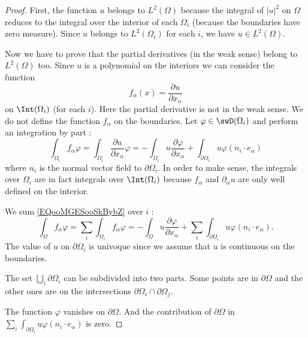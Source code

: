 \begin{proof}
    First, the function \( u\) belongs to \( L^2(\Omega)\) because the integral of \( | u |^2\) on \( \Omega\) reduces to the integral over the interior of each \( \Omega_i\) (because the boundaries have zero measure). Since \( u\) belongs to \( L^2(\Omega_i)\) for each \( i\), we have \( u\in L^2(\Omega)\).

    Now we have to prove that the partial derivatives (in the weak sense) belong to \( L^2(\Omega)\) too. Since \( u\) is a polynomial on the interiors we can consider the function
    \begin{equation}
        f_{\alpha}(x)=\frac{ \partial u }{ \partial x_{\alpha} }
    \end{equation}
    on \( \Int(\Omega_i)\) (for each \( i\)). Here the partial derivative is not in the weak sense. We do not define the function \( f_{\alpha}\) on the boundaries. Let \( \varphi\in \swD(\Omega_i)\) and perform an integration by part :
    \begin{equation}        \label{EQooMGESooSkBybZ}
        \int_{\Omega_i}f_{\alpha}\varphi=\int_{\Omega_i}\frac{ \partial u }{ \partial x_{\alpha} }\varphi=-\int_{\Omega_i}u\frac{ \partial \varphi }{ \partial x_{\alpha} }+\int_{\partial\Omega_i}u\varphi(n_i\cdot e_{\alpha})
    \end{equation}
    where \( n_i\) is the normal vector field to \( \partial\Omega_i\). In order to make sense, the integrals over \( \Omega_i\) are in fact integrals over \( \Int(\Omega_i)\) because \( f_{\alpha}\) and \( \partial_{\alpha}u\) are only well defined on the interior.

    We sum \eqref{EQooMGESooSkBybZ} over \( i\) :
    \begin{equation}        \label{EQooKACAooGlBMaQ}
        \int_{\Omega}f_{\alpha}\varphi=\sum_i\int_{\Omega_i}f_{\alpha}\varphi=-\int_{\Omega}u\frac{ \partial \varphi }{ \partial x_{\alpha} }+\sum_i\int_{\partial\Omega_i}u\varphi(n_i\cdot e_{\alpha}).
    \end{equation}
    The value of \( u\) on \( \partial \Omega_i\) is univoque since we assume that \( u\) is continuous on the boundaries.

    The set \( \bigcup_i\partial\Omega_i\) can be subdivided into two parts. Some points are in \( \partial \Omega\) and the other ones are on the intersections \( \partial\Omega_i\cap \partial\Omega_j\).

    The function \( \varphi\) vanishes on \( \partial\Omega\). And the contribution of \( \partial\Omega\) in \( \sum_i\int_{\partial\Omega_i}u\varphi (n_i\cdot e_{\alpha})\) is zero. 
    

\end{proof}
